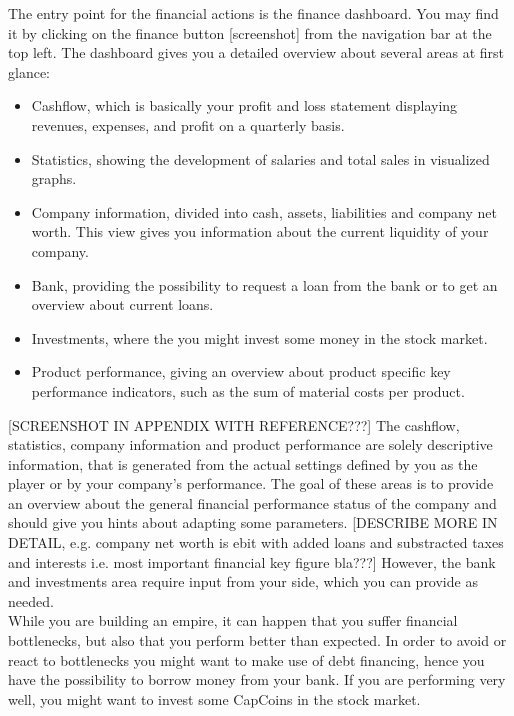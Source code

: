  The entry point for the financial actions is the finance dashboard. You may find it by clicking on the finance button [screenshot] from the navigation bar at the top left. The dashboard gives you a detailed overview about several areas at first glance:
\begin{itemize}
    \item Cashflow, which is basically your profit and loss statement displaying revenues, expenses, and profit on a quarterly basis.
    \item Statistics, showing the development of salaries and total sales in visualized graphs.
    \item Company information, divided into cash, assets, liabilities and company net worth. This view gives you information about the current liquidity of your company.
    \item Bank, providing the possibility to request a loan from the bank or to get an overview about current loans.
    \item Investments, where the you might invest some money in the stock market.
    \item Product performance, giving an overview about product specific key performance indicators, such as the sum of material costs per product.
\end{itemize}
[SCREENSHOT IN APPENDIX WITH REFERENCE???] The cashflow, statistics, company information and product performance are solely descriptive information, that is generated from the actual settings defined by you as the player or by your company’s performance. The goal of these areas is to provide an overview about the general financial performance status of the company and should give you hints about adapting some parameters. [DESCRIBE MORE IN DETAIL, e.g. company net worth is ebit with added loans and substracted taxes and interests i.e. most important financial key figure bla???] However, the bank and investments area require input from your side, which you can provide as needed. \\

While you are building an empire, it can happen that you suffer financial bottlenecks, but also that you perform better than expected. In order to avoid or react to bottlenecks you might want to make use of debt financing, hence you have the possibility to borrow money from your bank. If you are performing very well, you might want to invest some CapCoins in the stock market.\\

